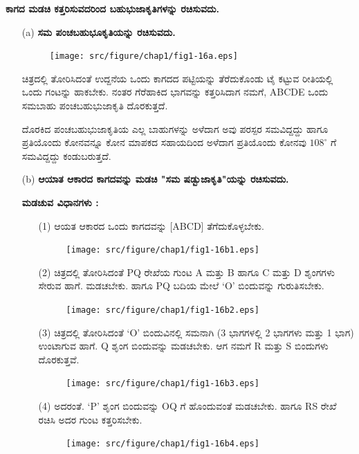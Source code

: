 \noindent
\textbf{ಕಾಗದ ಮಡಚಿ ಕತ್ತರಿಸುವದರಿಂದ ಬಹುಭುಜಾಕೃತಿಗಳನ್ನು ರಚಿಸುವದು.}
\begin{itemize}
\item[(a)] \textbf{ಸಮ ಪಂಚಬಹುಭೂಕೃತಿಯನ್ನು ರಚಿಸುವದು.}
\begin{figure}[H]
\centering
\texttt{[image: src/figure/chap1/fig1-16a.eps]}
\end{figure}

ಚಿತ್ರದಲ್ಲಿ ತೋರಿಸಿದಂತೆ ಉದ್ದನೆಯ ಒಂದು ಕಾಗದದ ಪಟ್ಟಿಯನ್ನು ತೆರೆದುಕೊಂಡು ಟೈ ಕಟ್ಟುವ ರೀತಿಯಲ್ಲಿ ಒಂದು ಗಂಟನ್ನು ಹಾಕಬೇಕು. ನಂತರ ಗೆರೆಹಾಕಿದ ಭಾಗವನ್ನು ಕತ್ತರಿಸಿದಾಗ ನಮಗೆ,  ABCDE ಒಂದು ಸಮಬಾಹು ಪಂಚಬಹುಭುಜಾಕೃತಿ ದೊರಕುತ್ತದೆ. 

\eject

ದೊರಕಿದ ಪಂಚಬಹುಭುಜಾಕೃತಿಯ ಎಲ್ಲ ಬಾಹುಗಳನ್ನು ಅಳೆದಾಗ ಅವು ಪರಸ್ಪರ ಸಮವಿದ್ದದ್ದು ಹಾಗೂ ಪ್ರತಿಯೊಂದು ಕೋನವನ್ನೂ ಕೋನ ಮಾಪಕದ ಸಹಾಯದಿಂದ ಅಳೆದಾಗ ಪ್ರತಿಯೊಂದು ಕೋನವು $108^\circ$ ಗೆ ಸಮವಿದ್ದದ್ದು ಕಂಡುಬರುತ್ತದೆ. 


\item[(b)] \textbf{ಆಯಾತ ಆಕಾರದ ಕಾಗದವನ್ನು ಮಡಚಿ "ಸಮ ಷಡ್ಬುಜಾಕೃತಿ"ಯನ್ನು ರಚಿಸುವದು.}

\noindent
\textbf{ಮಡಚುವ ವಿಧಾನಗಳು : }
\begin{enumerate}
\item[(1)] ಆಯತ ಆಕಾರದ ಒಂದು ಕಾಗದವನ್ನು [ABCD] ತೆಗೆದುಕೊಳ್ಳಬೇಕು.
\begin{figure}[H]
\centering
\texttt{[image: src/figure/chap1/fig1-16b1.eps]}
\end{figure}

\item[(2)] ಚಿತ್ರದಲ್ಲಿ ತೋರಿಸಿದಂತೆ PQ ರೇಖೆಯ ಗುಂಟ A ಮತ್ತು  B ಹಾಗೂ  C ಮತ್ತು  D ಶೃಂಗಗಳು ಸೇರುವ ಹಾಗೆ. ಮಡಚಬೇಕು. ಹಾಗೂ PQ ಬದಿಯ ಮೇಲೆ `O' ಬಿಂದುವನ್ನು ಗುರುತಿಸಬೇಕು.
\begin{figure}[H]
\centering
\texttt{[image: src/figure/chap1/fig1-16b2.eps]}
\end{figure}

\item[(3)] ಚಿತ್ರದಲ್ಲಿ ತೋರಿಸಿದಂತೆ  `O' ಬಿಂದುವಿನಲ್ಲಿ ಸಮನಾಗಿ (3 ಭಾಗಗಳಲ್ಲಿ 2 ಭಾಗಗಳು ಮತ್ತು 1 ಭಾಗ) ಉಂಟಾಗುವ ಹಾಗೆ. Q ಶೃಂಗ ಬಿಂದುವನ್ನು ಮಡಚಬೇಕು. ಆಗ ನಮಗೆ R ಮತ್ತು  S ಬಿಂದುಗಳು ದೊರಕುತ್ತವೆ. 
\begin{figure}[H]
\centering
\texttt{[image: src/figure/chap1/fig1-16b3.eps]}
\end{figure}

\item[(4)] ಅದರಂತೆ. `P' ಶೃಂಗ ಬಿಂದುವನ್ನು OQ ಗೆ ಹೊಂದುವಂತೆ ಮಡಚಬೇಕು. ಹಾಗೂ RS ರೇಖೆ ರಚಿಸಿ ಅದರ ಗುಂಟ ಕತ್ತರಿಸಬೇಕು. 
\begin{figure}[H]
\centering
\texttt{[image: src/figure/chap1/fig1-16b4.eps]}
\end{figure}


\end{enumerate}
\end{itemize}
